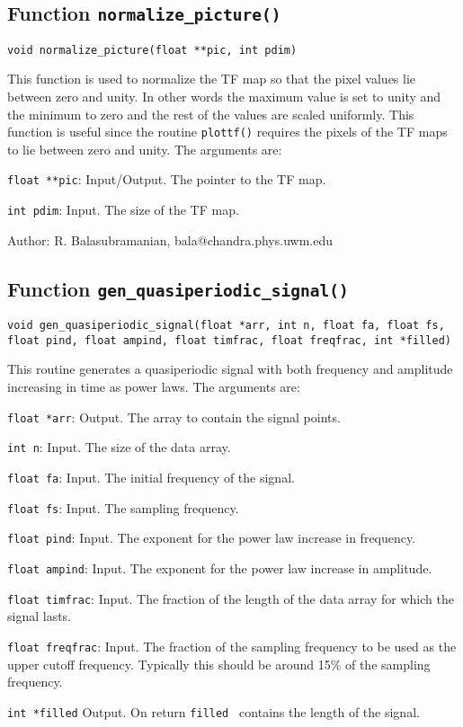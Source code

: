 \subsection{Function {\tt normalize\_picture()}}

{\tt void normalize\_picture(float **pic, int pdim)}

This function is used to normalize the TF map so that the pixel values
lie between zero and unity. In other words the maximum value is set to
unity and the minimum to zero and the rest of the values are scaled
uniformly. This function is useful since the routine {\tt plottf()}
requires the pixels of the TF maps to lie between zero and unity.
The arguments are:
\begin{description}
\item {\tt float **pic}: Input/Output. The pointer to the TF map.
\item {\tt int pdim}: Input. The size of the TF map. 
\end{description}

\noindent Author: R. Balasubramanian, bala@chandra.phys.uwm.edu


\subsection{Function {\tt gen\_quasiperiodic\_signal()}}

{\tt void gen\_quasiperiodic\_signal(float  *arr, int n, float fa, float
fs, float pind, float ampind, float timfrac, float freqfrac, int
*filled)}

This routine generates a quasiperiodic signal with both 
frequency and amplitude
increasing in time as power laws. The arguments are:
\begin{description}
\item {\tt float *arr}: Output. The array to contain the signal
points.
\item {\tt int n}: Input. The size of the data array.
\item {\tt float fa}: Input. The initial frequency of the signal. 
\item {\tt float fs}: Input. The sampling frequency.
\item {\tt float pind}: Input. The exponent for the power law increase
in frequency.
\item {\tt float ampind}: Input. The exponent for the power law increase
in amplitude.
\item {\tt float timfrac}: Input. The fraction of the length of
the data array for which the signal lasts.
\item {\tt float freqfrac}: Input. The fraction of the sampling
 frequency to be used as the upper cutoff frequency. Typically this
 should be around 15\% of the sampling frequency.
\item{\tt int *filled} Output. On return {\tt *filled } contains
the length of the signal.
\end{description}

